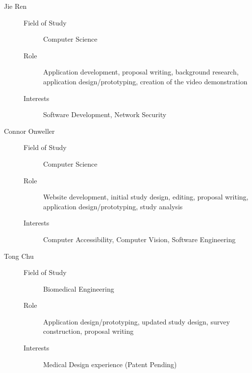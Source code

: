 \documentclass[acmsmall, nonacm]{acmart}
\begin{document}
\begin{description}
\item[Jie Ren] \hfill
  \begin{description}
    \item[Field of Study] Computer Science
    \item[Role] Application development, proposal writing, background research,
      application design/prototyping, creation of the video demonstration
    \item[Interests] Software Development, Network Security
  \end{description}
\item[Connor Onweller] \hfill
  \begin{description}
    \item[Field of Study] Computer Science
    \item[Role] Website development, initial study design, editing, proposal
      writing, application design/prototyping, study analysis
    \item[Interests] Computer Accessibility, Computer Vision, Software Engineering
  \end{description}
\item[Tong Chu] \hfill
  \begin{description}
    \item[Field of Study] Biomedical Engineering
    \item[Role] Application design/prototyping, updated study design, survey
      construction, proposal writing
    \item[Interests] Medical Design experience (Patent Pending)
  \end{description}
\end{description}


\newpage




\newpage
\end{document}
